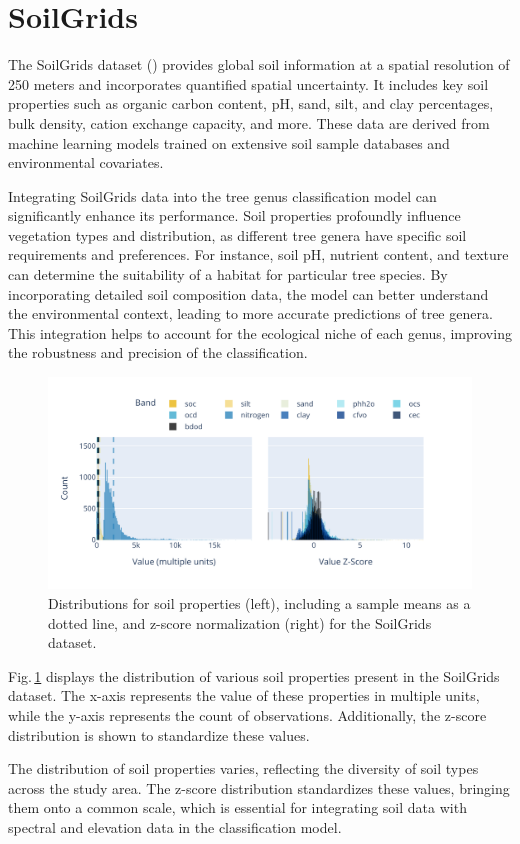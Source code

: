 \section{SoilGrids}

The SoilGrids dataset (\cite{soil_report}) provides global soil information at a spatial resolution of 250 meters and incorporates quantified spatial uncertainty. It includes key soil properties such as organic carbon content, pH, sand, silt, and clay percentages, bulk density, cation exchange capacity, and more. These data are derived from machine learning models trained on extensive soil sample databases and environmental covariates.

Integrating SoilGrids data into the tree genus classification model can significantly enhance its performance. Soil properties profoundly influence vegetation types and distribution, as different tree genera have specific soil requirements and preferences. For instance, soil pH, nutrient content, and texture can determine the suitability of a habitat for particular tree species. By incorporating detailed soil composition data, the model can better understand the environmental context, leading to more accurate predictions of tree genera. This integration helps to account for the ecological niche of each genus, improving the robustness and precision of the classification.

\begin{figure}[ht]
    \centering
    \includegraphics[width=0.98\linewidth, trim={15pt 25pt 10pt 20pt}, clip]{figures/figures_features/soil_hist.pdf}
    \caption{Distributions for soil properties (left), including a sample means as a dotted line, and z-score normalization (right) for the SoilGrids dataset.}
    \label{fig:soil_hist}
\end{figure}

Fig.\,\ref{fig:soil_hist} displays the distribution of various soil properties present in the SoilGrids dataset. The x-axis represents the value of these properties in multiple units, while the y-axis represents the count of observations. Additionally, the z-score distribution is shown to standardize these values.

The distribution of soil properties varies, reflecting the diversity of soil types across the study area. The z-score distribution standardizes these values, bringing them onto a common scale, which is essential for integrating soil data with spectral and elevation data in the classification model.